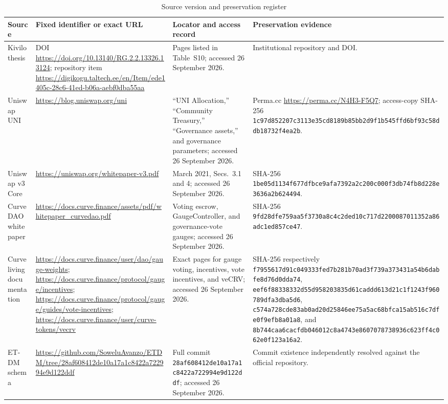 \documentclass[10pt]{article}
\begin{document}
\begin{table}[h]
\caption{Source version and preservation register}
\centering
\footnotesize
\begin{tabularx}{\linewidth}{@{}p{.14\linewidth}p{.29\linewidth}p{.20\linewidth}Y@{}}
\toprule
Source & Fixed identifier or exact URL & Locator and access record & Preservation evidence \\
\midrule
Kivilo thesis & DOI \url{https://doi.org/10.13140/RG.2.2.13326.13124}; repository item \url{https://digikogu.taltech.ee/en/Item/ede1405c-28c6-41ed-b06a-aebf0dba55aa} & Pages listed in Table~S10; accessed 26 September 2026. & Institutional repository and DOI. \\
Uniswap UNI & \url{https://blog.uniswap.org/uni} & ``UNI Allocation,'' ``Community Treasury,'' ``Governance assets,'' and governance parameters; accessed 26 September 2026. & Perma.cc \url{https://perma.cc/N4H3-F5Q7}; access-copy SHA-256 \nolinkurl{1c97d852207c3113e35cd8189b85bb2d9f1b545ffd6bf93c58ddb18732f4ea2b}. \\
Uniswap v3 Core & \url{https://uniswap.org/whitepaper-v3.pdf} & March 2021, Secs.~3.1 and 4; accessed 26 September 2026. & SHA-256 \nolinkurl{1be05d1134f677dfbce9afa7392a2c200c000f3db74fb8d228e3636a2b624494}. \\
Curve DAO white paper & \url{https://docs.curve.finance/assets/pdf/whitepaper_curvedao.pdf} & Voting escrow, GaugeController, and governance-vote gauges; accessed 26 September 2026. & SHA-256 \nolinkurl{9fd28dfe759aa5f3730a8c4c2ded10c717d2200087011352a86adc1ed857ce47}. \\
Curve living documentation & \url{https://docs.curve.finance/user/dao/gauge-weights}; \url{https://docs.curve.finance/protocol/gauge/incentives}; \url{https://docs.curve.finance/protocol/gauge/guides/vote-incentives}; \url{https://docs.curve.finance/user/curve-tokens/vecrv} & Exact pages for gauge voting, incentives, vote incentives, and veCRV; accessed 26 September 2026. & SHA-256 respectively \nolinkurl{f7955617d91c049333fed7b281b70ad3f739a373431a54b6dabfe8d76d0dda74}, \nolinkurl{eef6f88338332d55d958203835d61caddd613d21c1f1243f960789dfa3dba5d6}, \nolinkurl{c574a728cde83ab0ad20d25846ee75a5ac68bfca15ab516c7dfe0f9efb8a01a8}, and \nolinkurl{8b744caa6cacfdb046012c8a4743e8607078738936c623ff4c062e0f123a16a2}. \\
ET-DM schema & \url{https://github.com/SoweluAvanzo/ETDM/tree/28af608412de10a17a1c8422a722994e9d122ddf} & Full commit \nolinkurl{28af608412de10a17a1c8422a722994e9d122ddf}; accessed 26 September 2026. & Commit existence independently resolved against the official repository. \\

\end{tabularx}
\end{table}
\end{document}
